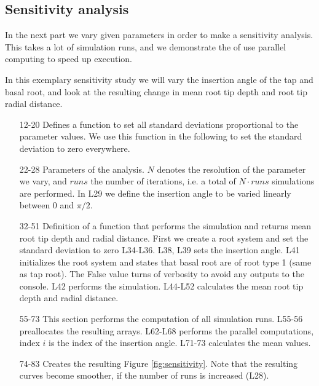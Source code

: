 \subsection{Sensitivity analysis} \label{ssec:sensitivity}

In the next part we vary given parameters in order to make a sensitivity analysis. This takes a lot of simulation runs, and we demonstrate the of use parallel computing to speed up execution.

In this exemplary sensitivity study we will vary the insertion angle of the tap and basal root, and look at the resulting change in mean root tip depth and root tip radial distance. 



\begin{itemize}

\item[12-20] Defines a function to set all standard deviations proportional to the parameter values. We use this function in the following to set the standard deviation to zero everywhere. 

\item[22-28] Parameters of the analysis. $N$ denotes the resolution of the parameter we vary, and $runs$ the number of iterations, i.e. a total of $N\cdot runs$ simulations are performed. In L29 we define the insertion angle to be varied linearly between 0 and $\pi/2$.

\item[32-51] Definition of a function that performs the simulation and returns mean root tip depth and radial distance. First we create a root system and set the standard deviation to zero L34-L36. L38, L39 sets the insertion angle. L41 initializes the root system and states that basal root are of root type 1 (same as tap root). The False value turns of verbosity to avoid any outputs to the console. L42 performs the simulation. L44-L52 calculates the mean root tip depth and radial distance. 

\item[55-73] This section performs the computation of all simulation runs. L55-56 preallocates the resulting arrays. L62-L68 performs the parallel computations, index $i$ is the index of the insertion angle. L71-73 calculates the mean values.

\item[74-83] Creates the resulting Figure \ref{fig:sensitivity}. Note that the resulting curves become smoother, if the number of runs is increased (L28).

\end{itemize}

